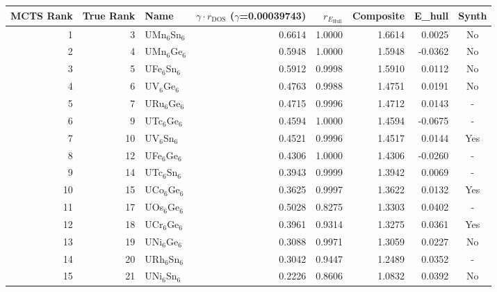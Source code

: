 \begin{tabular}{rrlrrrrc}
\toprule
MCTS Rank & True Rank & Name & $\gamma \cdot r_{\mathrm{DOS}}$ ($\gamma$=0.00039743) & $r_{E_{\mathrm{Hull}}}$ & Composite & E\_hull & Synth \\
\midrule
1 & 3 & UMn$_{6}$Sn$_{6}$ & 0.6614 & 1.0000 & 1.6614 & 0.0025 & No \\
2 & 4 & UMn$_{6}$Ge$_{6}$ & 0.5948 & 1.0000 & 1.5948 & -0.0362 & No \\
3 & 5 & UFe$_{6}$Sn$_{6}$ & 0.5912 & 0.9998 & 1.5910 & 0.0112 & No \\
4 & 6 & UV$_{6}$Ge$_{6}$ & 0.4763 & 0.9988 & 1.4751 & 0.0191 & No \\
5 & 7 & URu$_{6}$Ge$_{6}$ & 0.4715 & 0.9996 & 1.4712 & 0.0143 & - \\
6 & 9 & UTc$_{6}$Ge$_{6}$ & 0.4594 & 1.0000 & 1.4594 & -0.0675 & - \\
7 & 10 & UV$_{6}$Sn$_{6}$ & 0.4521 & 0.9996 & 1.4517 & 0.0144 & Yes \\
8 & 12 & UFe$_{6}$Ge$_{6}$ & 0.4306 & 1.0000 & 1.4306 & -0.0260 & - \\
9 & 14 & UTc$_{6}$Sn$_{6}$ & 0.3943 & 0.9999 & 1.3942 & 0.0069 & - \\
10 & 15 & UCo$_{6}$Ge$_{6}$ & 0.3625 & 0.9997 & 1.3622 & 0.0132 & Yes \\
11 & 17 & UOs$_{6}$Ge$_{6}$ & 0.5028 & 0.8275 & 1.3303 & 0.0402 & - \\
12 & 18 & UCr$_{6}$Ge$_{6}$ & 0.3961 & 0.9314 & 1.3275 & 0.0361 & Yes \\
13 & 19 & UNi$_{6}$Ge$_{6}$ & 0.3088 & 0.9971 & 1.3059 & 0.0227 & No \\
14 & 20 & URh$_{6}$Sn$_{6}$ & 0.3042 & 0.9447 & 1.2489 & 0.0352 & - \\
15 & 21 & UNi$_{6}$Sn$_{6}$ & 0.2226 & 0.8606 & 1.0832 & 0.0392 & No \\
\bottomrule
\end{tabular}
